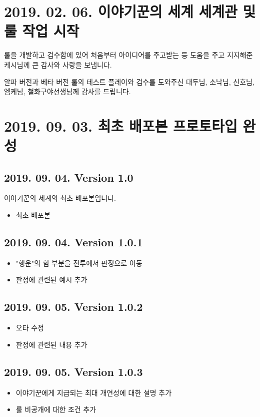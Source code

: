 \documentclass{report}
\begin{document}
	\section*{2019. 02. 06. 이야기꾼의 세계 세계관 및 룰 작업 시작}
	룰을 개발하고 검수함에 있어 처음부터 아이디어를 주고받는 등 도움을 주고 지지해준 케시님께 큰 감사와 사랑을 보냅니다.
	
	알파 버전과 베타 버전 룰의 테스트 플레이와 검수를 도와주신 대두님, 소낙님, 신호님, 엠케님, 철화구야선생님께 감사를 드립니다.
	
	\section*{2019. 09. 03. 최초 배포본 프로토타입 완성}
	\subsection*{2019. 09. 04. Version 1.0}
	이야기꾼의 세계의 최초 배포본입니다.
\iffalse
	\begin{itemize}
		\item 최초 배포본
	\end{itemize}
	
	\subsection*{2019. 09. 04. Version 1.0.1}
	\begin{itemize}
		\item "행운"의 힘 부분을 전투에서 판정으로 이동
		\item 판정에 관련된 예시 추가
	\end{itemize}
	
	\subsection*{2019. 09. 05. Version 1.0.2}
	\begin{itemize}
		\item 오타 수정
		\item 판정에 관련된 내용 추가
	\end{itemize}
	
	\subsection*{2019. 09. 05. Version 1.0.3}
	\begin{itemize}
		\item 이야기꾼에게 지급되는 최대 개연성에 대한 설명 추가
		\item 룰 비공개에 대한 조건 추가
	\end{itemize}
	
\end{document}

